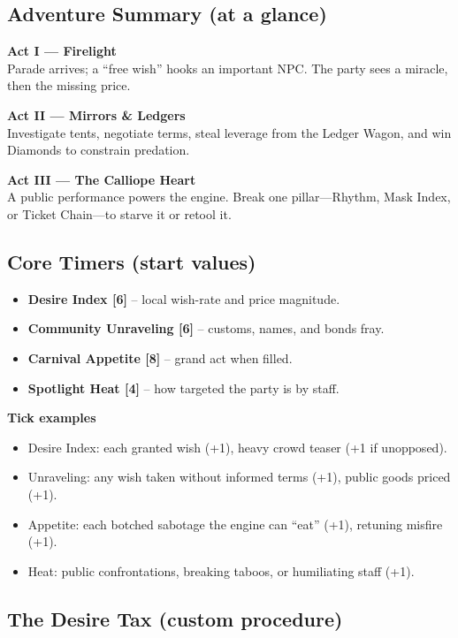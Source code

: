 \documentclass[11pt]{article}
\newcommand{\divider}{\vspace{12pt}\noindent\makebox[\linewidth]{\rule{\textwidth}{0.4pt}}\vspace{12pt}}
\begin{document}
\divider

\subsection*{Adventure Summary (at a glance)}

\textbf{Act I --- Firelight} \\
Parade arrives; a ``free wish'' hooks an important NPC. The party sees a miracle, then the missing price.

\textbf{Act II --- Mirrors \& Ledgers} \\
Investigate tents, negotiate terms, steal leverage from the Ledger Wagon, and win Diamonds to constrain predation.

\textbf{Act III --- The Calliope Heart} \\
A public performance powers the engine. Break one pillar---Rhythm, Mask Index, or Ticket Chain---to starve it or retool it.

\divider

\subsection*{Core Timers (start values)}
\begin{itemize}
\item \textbf{Desire Index [6]} -- local wish-rate and price magnitude.
\item \textbf{Community Unraveling [6]} -- customs, names, and bonds fray.
\item \textbf{Carnival Appetite [8]} -- grand act when filled.
\item \textbf{Spotlight Heat [4]} -- how targeted the party is by staff.
\end{itemize}

\textbf{Tick examples}
\begin{itemize}
\item Desire Index: each granted wish (+1), heavy crowd teaser (+1 if unopposed).
\item Unraveling: any wish taken without informed terms (+1), public goods priced (+1).
\item Appetite: each botched sabotage the engine can ``eat'' (+1), retuning misfire (+1).
\item Heat: public confrontations, breaking taboos, or humiliating staff (+1).
\end{itemize}

\divider

\subsection*{The Desire Tax (custom procedure)}
\end{document}
